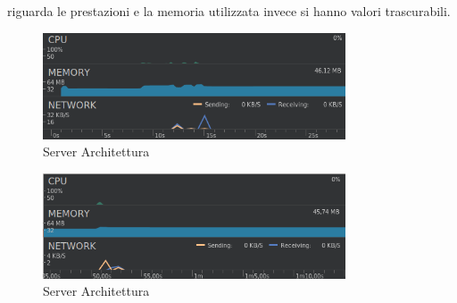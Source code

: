 riguarda le prestazioni e la memoria utilizzata invece si hanno valori trascurabili.\\



\begin{figure}[!hb]
  \centering
  \includegraphics[width=0.8\textwidth]{immagini/app_java_memory_graph.png}
  \caption{Server Architettura}\label{fig:Android Studio }
\end{figure}

\begin{figure}[!hb]
  \centering
  \includegraphics[width=0.8\textwidth]{immagini/app_kotlin_memory_graph.png}
  \caption{Server Architettura}\label{fig:Android Studio }
\end{figure}





\clearpage{\pagestyle{empty}\cleardoublepage}
